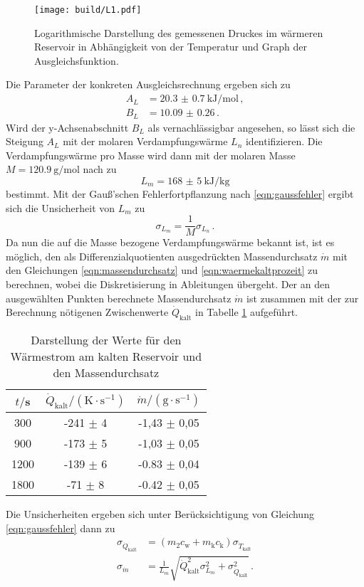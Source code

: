 \begin{figure}[H]
  \centering
  \texttt{[image: build/L1.pdf]}
  \caption{Logarithmische Darstellung des gemessenen Druckes im wärmeren Reservoir
   in Abhängigkeit von der Temperatur und Graph der Ausgleichsfunktion.}
  \label{fig:dampf}
\end{figure}

Die Parameter der konkreten Ausgleichsrechnung ergeben sich zu
\begin{align*}
  A_L &= \SI{20.3(07)}{\kilo\joule\per\mol}\,, \\
  B_L &= \SI{10.09(026)} \,.
\end{align*}
Wird der y-Achsenabschnitt $B_L$ als vernachlässigbar angesehen, so lässt sich die
Steigung $A_L$ mit der molaren Verdampfungswärme $L_n$ identifizieren.
Die Verdampfungswärme pro Masse wird dann mit der molaren Masse $M = \SI{120.9}{\gram\per\mol}$
nach \cite{molaremasse} zu
\begin{equation*}
  L_m = \SI{168(5)}{\kilo\joule\per\kilogram}
\end{equation*}
bestimmt. Mit der Gauß'schen Fehlerfortpflanzung nach \eqref{eqn:gaussfehler} ergibt sich
die Unsicherheit von $L_m$ zu
\begin{equation*}
  \sigma_{L_m} = \frac{1}{M} \sigma_{L_n}\,.
\end{equation*}
Da nun die auf die Masse bezogene Verdampfungswärme bekannt ist, ist es möglich, den
als Differenzialquotienten ausgedrückten Massendurchsatz $\dot{m}$ mit den Gleichungen
\eqref{eqn:massendurchsatz} und \eqref{eqn:waermekaltprozeit} zu berechnen, wobei die
Diskretisierung in Ableitungen übergeht.
Der an den ausgewählten Punkten berechnete Massendurchsatz $\dot{m}$ ist zusammen mit
der zur Berechnung nötigenen Zwischenwerte $\dot{Q}_\text{kalt}$ in Tabelle
\ref{tab:tabmassendurchsatz} aufgeführt.
\begin{table}
		\centering
    \caption{Darstellung der Werte für den Wärmestrom am kalten Reservoir und den Massendurchsatz}
    \label{tab:tabmassendurchsatz}
		\begin{tabular}{ccc}
			\toprule
			$t/$s & $\dot{Q}_\text{kalt}/(\text{K} \cdot \text{s}^{-1})$ & $\dot{m}/(\text{g} \cdot \text{s}^{-1})$ \\
			\midrule
      300  & -241 $\pm$ 4 & -1,43 $\pm$ 0,05 \\
      900  & -173 $\pm$ 5 & -1,03 $\pm$ 0,05 \\
      1200 & -139 $\pm$ 6 & -0.83 $\pm$ 0,04 \\
      1800 &  -71  $\pm$ 8 & -0.42 $\pm$ 0,05 \\
			\bottomrule
		\end{tabular}
	\end{table}
Die Unsicherheiten ergeben sich unter Berücksichtigung von Gleichung \eqref{eqn:gaussfehler} dann zu
\begin{align*}
  \sigma_{\dot{Q}_\text{kalt}} &= (m_2 c_\text{w} + m_\text{k} c_\text{k}) \sigma_{\dot{T}_\text{kalt}} \,\\
  \sigma_{\dot{m}} &= \frac{1}{L_m} \sqrt{\dot{Q}_\text{kalt}^2 \sigma_{L_m}^2 + \sigma_{\dot{Q}_\text{kalt}}^2}\,.
\end{align*}

